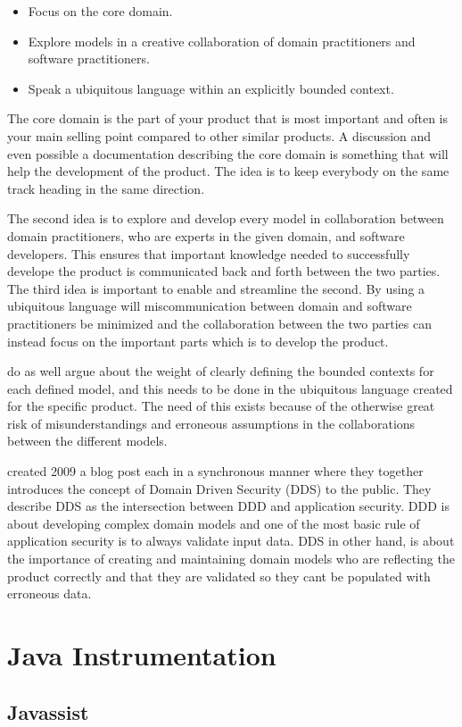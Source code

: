 \begin{itemize}
  \item Focus on the core domain.
  \item Explore models in a creative collaboration of domain practitioners and software practitioners.
  \item Speak a ubiquitous language within an explicitly bounded context.
\end{itemize}

The core domain is the part of your product that is most important and often is your main selling point compared to other similar products. \parencite{millett_2015} A discussion and even possible a documentation describing the core domain is something that will help the development of the product. The idea is to keep everybody on the same track heading in the same direction. \parencite{EvansEric2004Dd:t}

The second idea is to explore and develop every model in collaboration between domain practitioners, who are experts in the given domain, and software developers. This ensures that important knowledge needed to successfully develope the product is communicated back and forth between the two parties. \parencite{millett_2015} The third idea is important to enable and streamline the second. By using a ubiquitous language will miscommunication between domain and software practitioners be minimized and the collaboration between the two parties can instead focus on the important parts which is to develop the product. \parencite{evans_2015}

\textcite{evans_2015} do as well argue about the weight of clearly defining the bounded contexts for each defined model, and this needs to be done in the ubiquitous language created for the specific product. The need of this exists because of the otherwise great risk of misunderstandings and erroneous assumptions in the collaborations between the different models. \parencite{millett_2015}

\textcite{Wilander2009, Johnsson2009} created 2009 a blog post each in a synchronous manner where they together introduces the concept of Domain Driven Security (DDS) to the public. They describe DDS as the intersection between DDD and application security. DDD is about developing complex domain models and one of the most basic rule of application security is to always validate input data. DDS in other hand, is about the importance of creating and maintaining domain models who are reflecting the product correctly and that they are validated so they cant be populated with erroneous data. \parencite{Wilander2009, Johnsson2009, Arnor2016, Stendahl2016}


\section{Java Instrumentation}



\subsection{Javassist}

